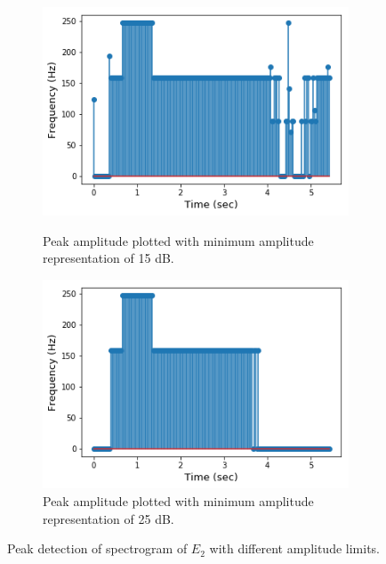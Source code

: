 \begin{figure}[H]
\begin{subfigure}{0.49\textwidth}
\end{subfigure}
\begin{subfigure}{0.49\textwidth}
\centering
\includegraphics[width=\textwidth]{figures/peak_detection/20170511_15.png}
\caption{Peak amplitude plotted with minimum amplitude representation of 15 dB.}
\label{fig:freq_15dB_Amp_pass}

\includegraphics[width=\textwidth]{figures/peak_detection/20170511_25.png}
\caption{Peak amplitude plotted with minimum amplitude representation of 25 dB.}
\label{fig:freq_25dB_Amp_pass}

\end{subfigure}
\caption{Peak detection of spectrogram of $E_2$ with different amplitude limits.}
\label{fig:valdation_peak_detection}
\end{figure}


